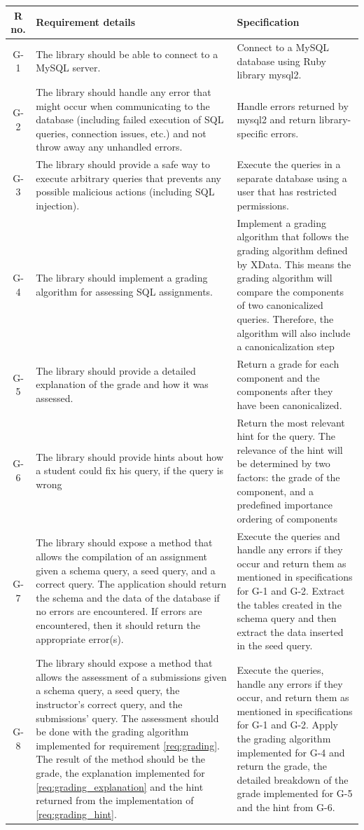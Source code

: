 \begin{tabularx}{\textwidth}{|c|Y|Y|}
  \hline
  \textbf{R no.} & \textbf{Requirement details} & \textbf{Specification} \\\hline
  \endhead
G-1 & The library should be able to connect to a MySQL server. & Connect to a MySQL database using Ruby library mysql2. \\\hline
G-2 & The library should handle any error that might occur when communicating to the database (including failed execution of SQL queries, connection issues, etc.) and not throw away any unhandled errors. & Handle errors returned by mysql2 and return library-specific errors. \\\hline
G-3 & The library should provide a safe way to execute arbitrary queries that prevents any possible malicious actions (including SQL injection). & Execute the queries in a separate database using a user that has restricted permissions. \\\hline
G-4 & The library should implement a grading algorithm for assessing SQL assignments. & Implement a grading algorithm that follows the grading algorithm defined by XData. This means the grading algorithm will compare the components of two canonicalized queries. Therefore, the algorithm will also include a canonicalization step \\\hline
G-5 & The library should provide a detailed explanation of the grade and how it was assessed. & Return a grade for each component and the components after they have been canonicalized. \\\hline
G-6 & The library should provide hints about how a student could fix his query, if the query is wrong & Return the most relevant hint for the query. The relevance of the hint will be determined by two factors: the grade of the component, and a predefined importance ordering of components\\\hline
G-7 & The library should expose a method that allows the compilation of an assignment given a schema query, a seed query, and a correct query. The application should return the schema and the data of the database if no errors are encountered. If errors are encountered, then it should return the appropriate error(s). & Execute the queries and handle any errors if they occur and return them as mentioned in specifications for G-1 and G-2. Extract the tables created in the schema query and then extract the data inserted in the seed query. \\\hline
G-8 & The library should expose a method that allows the assessment of a submissions given a schema query, a seed query, the instructor's correct query, and the submissions' query.  The assessment should be done with the grading algorithm implemented for requirement \ref{req:grading}. The result of the method should be the grade, the explanation implemented for \ref{req:grading_explanation} and the hint returned from the implementation of \ref{req:grading_hint}. & Execute the queries, handle any errors if they occur, and return them as mentioned in specifications for G-1 and G-2. Apply the grading algorithm implemented for G-4 and return the grade, the detailed breakdown of the grade implemented for G-5 and the hint from G-6. \\\hline
\end{tabularx}
